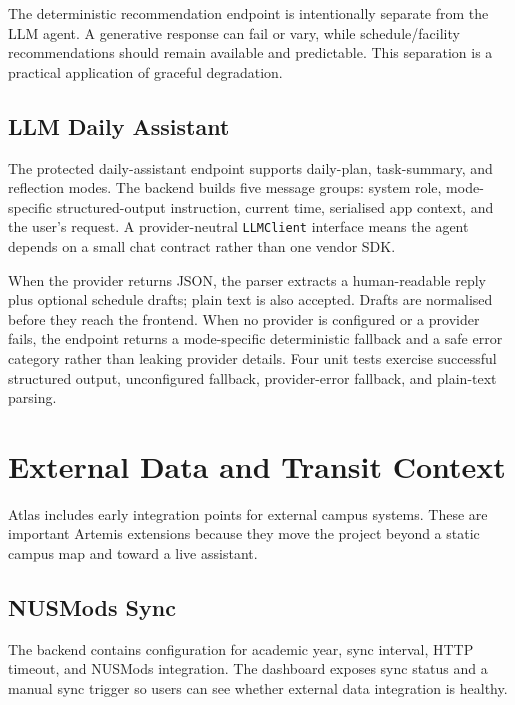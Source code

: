 \documentclass[11pt]{article}
\begin{document}
The deterministic recommendation endpoint is intentionally separate from the LLM agent. A generative response can fail or vary, while schedule/facility recommendations should remain available and predictable. This separation is a practical application of graceful degradation.

\subsection*{LLM Daily Assistant}

The protected daily-assistant endpoint supports daily-plan, task-summary, and reflection modes. The backend builds five message groups: system role, mode-specific structured-output instruction, current time, serialised app context, and the user's request. A provider-neutral \texttt{LLMClient} interface means the agent depends on a small chat contract rather than one vendor SDK.

When the provider returns JSON, the parser extracts a human-readable reply plus optional schedule drafts; plain text is also accepted. Drafts are normalised before they reach the frontend. When no provider is configured or a provider fails, the endpoint returns a mode-specific deterministic fallback and a safe error category rather than leaking provider details. Four unit tests exercise successful structured output, unconfigured fallback, provider-error fallback, and plain-text parsing.

\newpage

\section*{External Data and Transit Context}

Atlas includes early integration points for external campus systems. These are important Artemis extensions because they move the project beyond a static campus map and toward a live assistant.

\subsection*{NUSMods Sync}

The backend contains configuration for academic year, sync interval, HTTP timeout, and NUSMods integration. The dashboard exposes sync status and a manual sync trigger so users can see whether external data integration is healthy.
\end{document}

